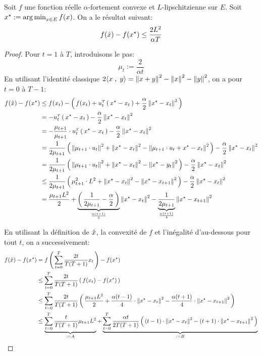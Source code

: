 \begin{theorem}

Soit $f$ une fonction réelle $\alpha$-fortement convexe et $L$-lipschitzienne sur
$E$. Soit $\xopt:= \argmin_{x\in E} f(x)$. On a le résultat suivant:
\begin{equation}
f(\xhat)-f(\xopt) \leq \frac{2 L^2}{\alpha T}
\end{equation}
\end{theorem}

\begin{proof}
Pour $t=1$ à $T$, introduisons le pas:
\begin{equation}
  \mu_t := \frac{2}{\alpha t}
\end{equation}
En utilisant l'identité classique $2\ps{x}{y} = \norme{x+y}^2-\norme{x}^2-\norme{y}^2$, on a pour $t=0$ à $T-1$:
\begin{align*}
f(\xhat)-f(\xopt) &\leq f(x_t)-\prt{f(x_t) + \transpose{u_t}\prt{\xopt-x_t}
+ \frac{\alpha}{2} \norme{\xopt-x_t}^2}\\
&= -\transpose{u_t}\prt{\xopt-x_t}
- \frac{\alpha}{2} \norme{\xopt-x_t}^2\\
&= -\frac{\step}{\step} \cdot \transpose{u_t}\prt{\xopt-x_t}
- \frac{\alpha}{2} \norme{\xopt-x_t}^2\\
&= \frac{1}{2 \step }\prt{\norme{\step \cdot u_t}^2+\norme{\xopt-x_t}^2-\norme{\step \cdot u_t+\xopt-x_t}^2
}- \frac{\alpha}{2} \norme{\xopt-x_t}^2\\
&= \frac{1}{2 \step }\prt{\norme{\step \cdot u_t}^2+\norme{\xopt-x_t}^2-\norme{ \xopt-y_t}^2
}- \frac{\alpha}{2} \norme{\xopt-x_t}^2\\
&\leq  \frac{1}{2 \step }\prt{\step^2\cdot L^2+\norme{\xopt-x_t}^2-\norme{\xopt-x_{t+1}}^2
}- \frac{\alpha}{2} \norme{\xopt-x_t}^2\\
&= \frac{\step L^2}{2} + \underbrace{\prt{\frac{1}{2 \step } - \frac{\alpha}{2}}}_{\frac{\alpha (t-1)}{4}} \norme{\xopt-x_t}^2
- \underbrace{\frac{1}{2 \step }}_{\frac{\alpha (t+1)}{4}} \norme{\xopt-x_{t+1}}^2
\end{align*}

En utilisant la définition de $\hat{x}$, la convexité de $f$ et l'inégalité d'au-dessous pour tout $t$, on a successivement:
\begin{align*}
  f(\xhat)-f(\xopt) &= f\prt{\sum_{t=0}^T \frac{2t}{T(T+1)} x_t}-f(\xopt)\\
  &\leq  \sum_{t=0}^T \frac{2t}{T(T+1)} \prt{f(x_t)-f(\xopt)}\\
  &\leq  \sum_{t=0}^T \frac{2t}{T(T+1)} \prt{\frac{\step L^2}{2}+\frac{\alpha (t-1)}{4} \cdot \norme{\xopt-x_t}^2-\frac{\alpha (t+1)}{4} \cdot  \norme{\xopt-x_{t+1}}^2}\\
  &\leq  \underbrace{\sum_{t=0}^T \frac{t}{T(T+1)} \step L^2}_{:=A}+\underbrace{\sum_{t=0}^T \frac{\alpha t}{2T(T+1)}  \prt{(t-1) \cdot \norme{\xopt-x_t}^2-(t+1) \cdot  \norme{\xopt-x_{t+1}}^2}}_{:=B}\\
\end{align*}


\end{proof}
